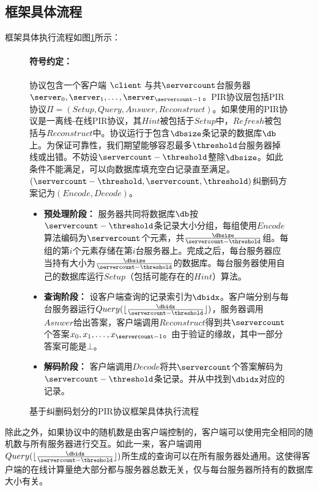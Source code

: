 \subsection{框架具体流程}
框架具体执行流程如图\ref{fig:framework-protocol}所示：
\begin{figure}
    \begin{mdframed}
        \paragraph{符号约定：} 协议包含一个客户端 $\client$ 与共$\servercount$台服务器 $\server_0,\server_1, \dots, \server_{\servercount-1}$。PIR协议层包括PIR协议$\Pi = (Setup, Query, Answer, Reconstruct)$。如果使用的PIR协议是一离线-在线PIR协议，其$Hint$被包括于$Setup$中，$Refresh$被包括与$Reconstruct$中。协议运行于包含$\dbsize$条记录的数据库$\db$上。为保证可靠性，我们期望能够容忍最多$\threshold$台服务器掉线或出错。不妨设$\servercount-\threshold$整除$\dbsize$。如此条件不能满足，可以向数据库填充空白记录直至满足。$(\servercount-\threshold, \servercount, \threshold)$纠删码方案记为$(Encode, Decode)$。

        \begin{itemize}
            \item \textbf{预处理阶段：} 服务器共同将数据库$\db$按$\servercount-\threshold$条记录大小分组，每组使用$Encode$算法编码为$\servercount$个元素，共$\frac{\dbsize}{\servercount-\threshold}$组。每组的第$i$个元素存储在第$i$台服务器上。完成之后，每台服务器应当持有大小为$\frac{\dbsize}{\servercount-\threshold}$的数据库。每台服务器使用自己的数据库运行$Setup$（包括可能存在的$Hint$）算法。
            \item \textbf{查询阶段：} 设客户端查询的记录索引为$\dbidx$。客户端分别与每台服务器运行$Query(\lfloor\frac{\dbidx}{\servercount-\threshold}\rfloor)$，服务器调用$Asnwer$给出答案，客户端调用$Reconstruct$得到共$\servercount$个答案$x_0, x_1, \dots, x_{\servercount-1}$。由于验证的缘故，其中一部分答案可能是$\bot$。
            \item \textbf{解码阶段：} 客户端调用$Decode$将共$\servercount$个答案解码为$\servercount-\threshold$条记录。并从中找到$\dbidx$对应的记录。
        \end{itemize}
    \end{mdframed}
    \caption{基于纠删码划分的PIR协议框架具体执行流程}
    \label{fig:framework-protocol}
\end{figure}

除此之外，如果协议中的随机数是由客户端控制的，客户端可以使用完全相同的随机数与所有服务器进行交互。如此一来，客户端调用$Query(\lfloor\frac{\dbidx}{\servercount-\threshold}\rfloor)$所生成的查询可以在所有服务器处通用。这使得客户端的在线计算量绝大部分都与服务器总数无关，仅与每台服务器所持有的数据库大小有关。

